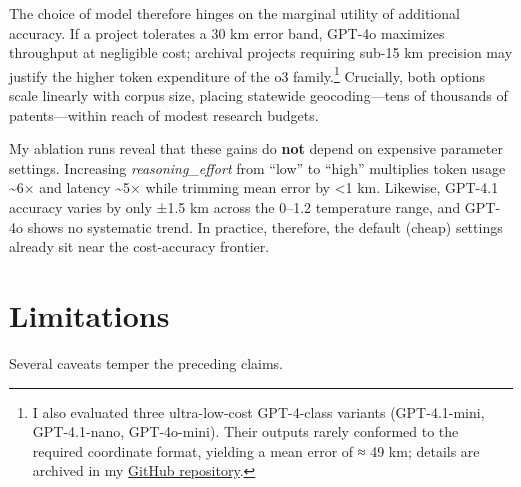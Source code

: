 The choice of model therefore hinges on the marginal utility of
additional accuracy. If a project tolerates a 30 km error band, GPT-4o
maximizes throughput at negligible cost; archival projects requiring
sub-15 km precision may justify the higher token expenditure of the o3
family.\footnote{I also evaluated three ultra-low-cost GPT-4-class
  variants (GPT-4.1-mini, GPT-4.1-nano, GPT-4o-mini). Their outputs
  rarely conformed to the required coordinate format, yielding a mean
  error of ≈ 49 km; details are archived in my
  \href{https://github.com/ryanmio/colonial-virginia-llm-geolocation}{GitHub
  repository}.} Crucially, both options scale linearly with corpus size,
placing statewide geocoding---tens of thousands of patents---within
reach of modest research budgets.

My ablation runs reveal that these gains do \textbf{not} depend on
expensive parameter settings. Increasing \emph{reasoning\_effort} from
``low'' to ``high'' multiplies token usage \textasciitilde6× and latency
\textasciitilde5× while trimming mean error by \textless1 km. Likewise,
GPT-4.1 accuracy varies by only ±1.5 km across the 0--1.2 temperature
range, and GPT-4o shows no systematic trend. In practice, therefore, the
default (cheap) settings already sit near the cost-accuracy frontier.

\section{Limitations}\label{limitations}

Several caveats temper the preceding claims.

